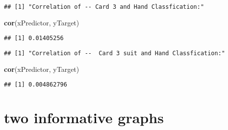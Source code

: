 \documentclass[]{article}
\newenvironment{Shaded}{\begin{snugshade}}{\end{snugshade}}
\newcommand{\KeywordTok}[1]{\textcolor[rgb]{0.13,0.29,0.53}{\textbf{#1}}}
\newcommand{\StringTok}[1]{\textcolor[rgb]{0.31,0.60,0.02}{#1}}
\newcommand{\OperatorTok}[1]{\textcolor[rgb]{0.81,0.36,0.00}{\textbf{#1}}}
\newcommand{\NormalTok}[1]{#1}
\begin{document}
\begin{Shaded}
\end{Shaded}

\begin{verbatim}
## [1] "Correlation of -- Card 3 and Hand Classfication:"
\end{verbatim}

\begin{Shaded}
\begin{Highlighting}[]
\KeywordTok{cor}\NormalTok{(xPredictor, yTarget)}
\end{Highlighting}
\end{Shaded}

\begin{verbatim}
## [1] 0.01405256
\end{verbatim}

\begin{Shaded}
\end{Shaded}

\begin{verbatim}
## [1] "Correlation of --  Card 3 suit and Hand Classfication:"
\end{verbatim}

\begin{Shaded}
\begin{Highlighting}[]
\KeywordTok{cor}\NormalTok{(xPredictor, yTarget)}
\end{Highlighting}
\end{Shaded}

\begin{verbatim}
## [1] 0.004862796
\end{verbatim}

\section{two informative graphs}\label{two-informative-graphs-1}
\end{document}
